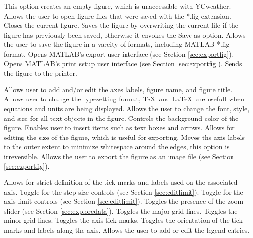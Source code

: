 \begin{itemize}
	 This option creates an empty figure, which is unaccessible with YCweather.
	 Allows the user to open figure files that were saved with the *.fig extension.
	 Closes the current figure.
	 Saves the figure by overwriting the current file if the figure has previously been saved, otherwise it envokes the Save as option.
	 Allows the user to save the figure in a vareity of formats, including MATLAB *.fig format.
	 Opens MATLAB's export user interface (see Section \ref{sec:exportfig}).
	 Opens MATLAB's print setup user interface (see Section \ref{sec:exportfig}).
	 Sends the figure to the printer.
\end{itemize}

\begin{itemize}
      Allows user to add and/or edit the axes labels, figure name, and figure title.
      Allows user to change the typesetting format, \TeX\ and \LaTeX\ are usefull when equations and units are being displayed.
      Allows the user to change the font, style, and size for all text objects in the figure.
      Controls the background color of the figure.
      Enables user to insert items such as text boxes and arrows.
      Allows for editing the size of the figure, which is useful for exporting.
      Moves the axis labels to the outer extent to minimize whitespace around the edges, this option is irreversible.
      Allows the user to export the figure as an image file (see Section \ref{sec:exportfig}).
\end{itemize}

\begin{itemize}
      Allows for strict definition of the tick marks and labels used on the associated axis. 
      Toggle for the step size controls (see Section \ref{sec:editlimit}).
      Toggle for the axis limit controls (see Section \ref{sec:editlimit}).
      Toggles the presence of the zoom slider (see Section \ref{sec:exploredata}).
      Toggles the major grid lines.
      Toggles the minor grid lines.
      Toggles the axis tick marks.
      Toggles the orientation of the tick marks and labels along the axis.
	  Allows the user to add or edit the legend entries.
\end{itemize}

